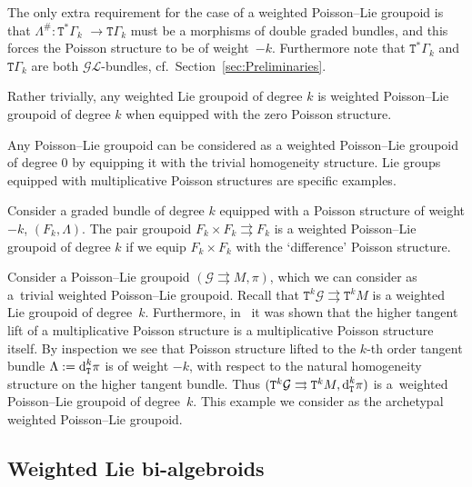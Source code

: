 \documentclass[pdftex]{sigma}
\newcommand{\rmd}{\textnormal{d}}
\def\sT{{\mathtt T}}
\numberwithin{equation}{section}
\begin{document}
The only extra requirement  for the case of a weighted Poisson--Lie groupoid is that $ \Lambda^{\#}\colon \sT^{*}\Gamma_{k}$ $\rightarrow \sT \Gamma_{k}$ must be a morphisms of double graded bundles, and this forces the Poisson structure to be of weight~${-}k$. Furthermore note that $\sT^{*}\Gamma_{k}$ and $\sT \Gamma_{k}$ are both $\mathcal{GL}$-bundles, cf.\ Section~\ref{sec:Preliminaries}.


\begin{Example}
Rather trivially, any weighted Lie groupoid of degree $k$ is weighted Poisson--Lie groupoid of degree $k$ when equipped with the zero Poisson structure.
\end{Example}

\begin{Example}
Any Poisson--Lie groupoid can be considered as a weighted Poisson--Lie groupoid of degree $0$ by equipping it with the trivial homogeneity structure. Lie groups equipped with  multiplicative Poisson structures are specif\/ic examples.
\end{Example}

\begin{Example}
Consider a graded bundle of degree $k$ equipped with a Poisson structure of weight $-k$, $(F_{k}, \Lambda)$. The pair groupoid $F_{k}\times F_{k} \rightrightarrows F_{k}$ is a weighted Poisson--Lie groupoid of degree $k$ if we equip $F_{k}\times F_{k}$ with the `dif\/ference' Poisson structure.
\end{Example}

\begin{Example}
Consider a Poisson--Lie groupoid $(\mathcal{G} \rightrightarrows M, \pi)$, which we can consider as a~trivial weighted Poisson--Lie groupoid. Recall that $\sT^{k}\mathcal{G} \rightrightarrows \sT^{k}M$ is a weighted Lie groupoid of degree~$k$. Furthermore, in~\cite{KouotchopWamba:2013} it was shown that the higher tangent lift of a multiplicative Poisson structure is  a multiplicative Poisson structure itself. By inspection we see that Poisson structure lifted to the $k$-th order tangent bundle $ \Lambda := \rmd_{\sT}^{k}\pi$ is of weight $-k$, with respect to the natural homogeneity structure on the higher tangent bundle. Thus $(\sT^{k}\mathcal{G} \rightrightarrows \sT^{k}M, \rmd_{\sT}^{k}\pi )$ is a~weighted Poisson--Lie groupoid of degree~$k$. This example we consider  as the archetypal weighted Poisson--Lie groupoid.
\end{Example}


\subsection{Weighted Lie bi-algebroids}
\end{document}

